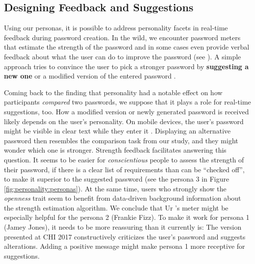 \subsection{Designing Feedback and Suggestions}
Using our personas, it is possible to address personality facets in real-time feedback during password creation. In the wild, we encounter password meters that estimate the strength of the password and in some cases even provide verbal feedback about what the user can do to improve the password (see  \cite{Carnavalet2014AnalyzingPWStrengthMeters,Wheeler2016zxcvbn}). A simple approach tries to convince the user to pick a stronger password by \textbf{suggesting a new one} or a modified version of the entered password \cite{Forget2008ImprovingPasswordsThroughPersuasion, Seitz2016SuggestionsDecoy, Shay2015SpoonfulOfSugar, Ur2017DataDrivenPWMeter}. 

Coming back to the finding that personality had a notable effect on how participants \textit{compared} two passwords, we suppose that it plays a role for real-time suggestions, too. How a modified version or newly generated password is received likely depends on the user's personality. On mobile devices, the user's password might be visible in clear text while they enter it \cite{Melicher2016UsabilityMobileTextPasswords}. Displaying an alternative password then resembles the comparison task from our study, and they might wonder which one is stronger. Strength feedback facilitates answering this question. It seems to be easier for \textit{conscientious} people to assess the strength of their password, if there is a clear list of requirements than can be ``checked off'', to make it superior to the suggested password (see the persona 3 in Figure \ref{fig:personality:personas}). At the same time, users who strongly show the \textit{openness} trait seem to benefit from data-driven background information about the strength estimation algorithm. We conclude that Ur \etal's meter might be especially helpful for the persona 2 (Frankie Fizz). To make it work for persona 1 (Jamey Jones), it needs to be more reassuring than it currently is: The version presented at CHI 2017 constructively criticizes the user's password and suggests alterations. Adding a positive message might make persona 1 more receptive for suggestions. 

